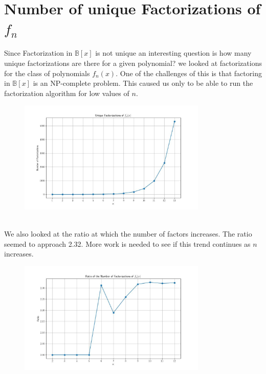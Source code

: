 \documentclass{article}
\newcommand{\B}{\mathbb{B}}
\begin{document}
    \section{Number of unique Factorizations of $f_n$}
    Since Factorization in $\B[x]$ is not unique an interesting question is how many  unique factorizations are there for a given polynomial?
    we looked at factorizations for the class of polynomials $f_n(x)$.
    One of the challenges of this is that factoring in $\B[x]$ is an NP-complete problem.
    This caused us only to be able to run the factorization algorithm for low values of $n$.
    \begin{figure}[!h]
        \centering
        \includegraphics[width=0.8\textwidth]{factorization.jpg}
    \end{figure}
    \\
    We also looked at the ratio at which the number of factors increases. The ratio seemed to approach 2.32.
    More work is needed to see if this trend continues as $n$ increases.
    \begin{figure}[!h]
        \centering
        \includegraphics[width=0.8\textwidth]{ratio.jpg}
    \end{figure}
\end{document}
